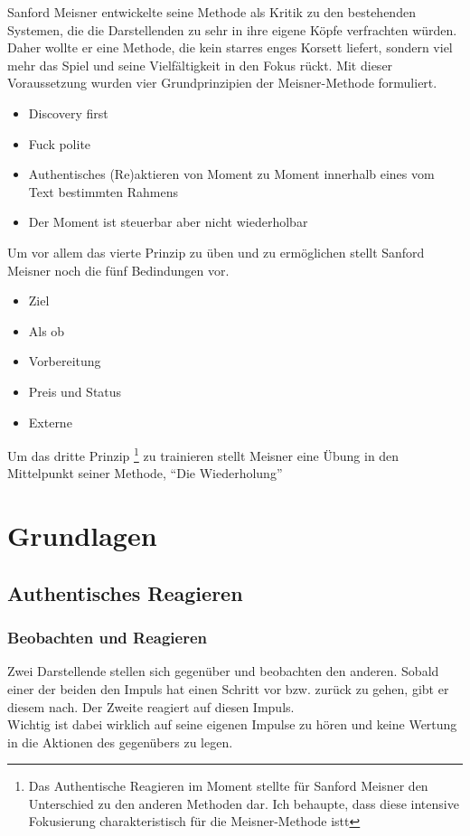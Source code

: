 \documentclass[ngerman, a4paper, twoside]{scrbook}%
\begin{document}
	Sanford Meisner entwickelte seine Methode als Kritik zu den bestehenden Systemen, die die Darstellenden zu sehr in ihre eigene Köpfe verfrachten würden. Daher wollte er eine Methode, die kein starres enges Korsett liefert, sondern viel mehr das Spiel und seine Vielfältigkeit in den Fokus rückt. Mit dieser Voraussetzung wurden vier Grundprinzipien der Meisner-Methode formuliert.
	\begin{itemize}
		\item Discovery first
		 \item Fuck polite
		 \item Authentisches (Re)aktieren von Moment zu Moment innerhalb eines vom Text bestimmten Rahmens
		 \item Der Moment ist steuerbar aber nicht wiederholbar
	\end{itemize}
	Um vor allem das vierte Prinzip zu üben und zu ermöglichen stellt Sanford Meisner noch die fünf Bedindungen vor.
	\begin{itemize}
		\item Ziel
		\item Als ob
		\item Vorbereitung
		\item Preis und Status
		\item Externe
	\end{itemize}
	Um das dritte Prinzip
	\footnote{Das Authentische Reagieren im Moment stellte für Sanford Meisner den Unterschied zu den anderen Methoden dar. Ich behaupte, dass diese intensive Fokusierung charakteristisch für die Meisner-Methode istt}
	 zu trainieren stellt Meisner eine Übung in den Mittelpunkt seiner Methode, "`Die Wiederholung"'


	\section{Grundlagen}

	\subsection{Authentisches Reagieren}
	\subsubsection{Beobachten und Reagieren}
	Zwei Darstellende stellen sich gegenüber und beobachten den anderen. Sobald einer der beiden den Impuls hat einen Schritt vor bzw. zurück zu gehen, gibt er diesem nach. Der Zweite reagiert auf diesen Impuls.\\
	Wichtig ist dabei wirklich auf seine eigenen Impulse zu hören und keine Wertung in die Aktionen des gegenübers zu legen.
\end{document}
